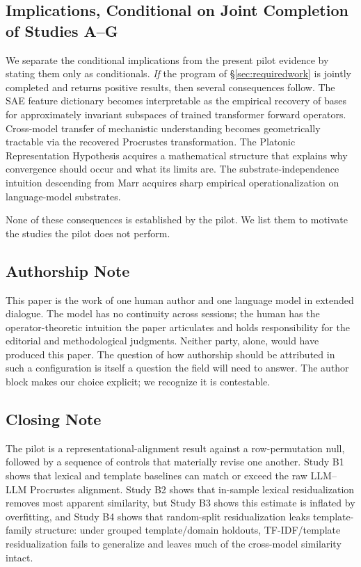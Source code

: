 \subsection{Implications, Conditional on Joint Completion of Studies A--G}

We separate the conditional implications from the present pilot
evidence by stating them only as conditionals. \emph{If} the program
of \S\ref{sec:requiredwork} is jointly completed and returns positive
results, then several consequences follow. The SAE feature dictionary
\cite{bricken2023monosemanticity, cunningham2024sparse,
templeton2024scaling, gao2024scaling, lieberum2024gemma} becomes
interpretable as the empirical recovery of bases for approximately
invariant subspaces of trained transformer forward operators.
Cross-model transfer of mechanistic understanding becomes geometrically
tractable via the recovered Procrustes transformation. The Platonic
Representation Hypothesis \cite{huh2024platonic} acquires a
mathematical structure that explains why convergence should occur and
what its limits are. The substrate-independence intuition descending
from Marr \cite{marr1982vision} acquires sharp empirical
operationalization on language-model substrates.

None of these consequences is established by the pilot. We list them
to motivate the studies the pilot does not perform.

\subsection{Authorship Note}

This paper is the work of one human author and one language model in
extended dialogue. The model has no continuity across sessions; the
human has the operator-theoretic intuition the paper articulates and
holds responsibility for the editorial and methodological judgments.
Neither party, alone, would have produced this paper. The question of
how authorship should be attributed in such a configuration is itself
a question the field will need to answer. The author block makes our
choice explicit; we recognize it is contestable.

\subsection*{Closing Note}

The pilot is a representational-alignment result against a
row-permutation null, followed by a sequence of controls that
materially revise one another. Study B1 shows that lexical and
template baselines can match or exceed the raw LLM--LLM Procrustes
alignment. Study B2 shows that in-sample lexical residualization
removes most apparent similarity, but Study B3 shows this estimate
is inflated by overfitting, and Study B4 shows that random-split
residualization leaks template-family structure: under grouped
template/domain holdouts, TF-IDF/template residualization fails to
generalize and leaves much of the cross-model similarity intact.

